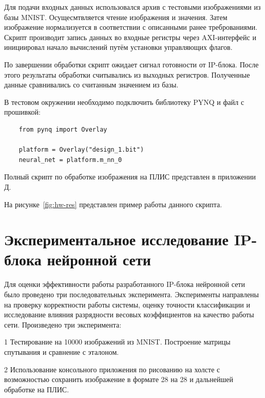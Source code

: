 Для подачи входных данных использовался архив с тестовыми изображениями из 
базы MNIST. Осущесмтвляется чтение изображения и значения. Затем изображение
нормализуется в соответствии с описанными ранее треброваниями. Скрипт 
производит запись данных во входные регистры через AXI-интерфейс и
инициировал начало вычислений путём установки управляющих флагов.

По завершении обработки скрипт ожидает сигнал готовности от IP-блока. После 
этого результаты обработки считывались из выходных регистров. Полученные данные 
сравнивались со считанным значением из базы.

В тестовом окружении необходимо подключить библиотеку PYNQ и файл с прошивкой:

\small
\fontsize{12pt}{12pt}\selectfont
\begin{verbatim}
    from pynq import Overlay 

    platform = Overlay("design_1.bit")
    neural_net = platform.m_nn_0
\end{verbatim}
\normalsize
\fontsize{14pt}{14pt}\selectfont

Полный скрипт по обработке изображения на ПЛИС представлен в приложении Д.

На рисунке~\ref{fig:hw-res} представлен пример работы данного скрипта.


\section{Экспериментальное исследование IP-блока нейронной сети}\par
\hspace*{12.5 mm}Для оценки эффективности работы разработанного IP-блока 
нейронной сети было проведено три последовательных эксперимента. Эксперименты 
направлены на проверку корректности работы системы, оценку точности 
классификации и исследование влияния разрядности весовых коэффициентов на 
качество работы сети. Произведено три эксперимента:

    1 Тестирование на 10000 изображений из MNIST. Построение матрицы спутывания
    и сравнение с эталоном.

    2 Использование консольного приложения по рисованию на холсте с 
    возможностью сохранить изображение в формате 28 на 28 и дальнейшей 
    обработке на ПЛИС.

